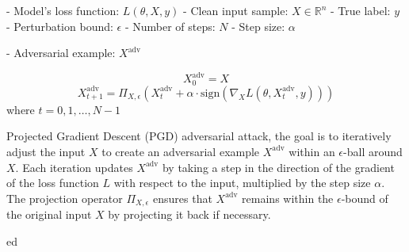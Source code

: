 - Model's loss function: $L(\theta, X, y)$
- Clean input sample: $X \in \mathbb{R}^n$
- True label: $y$
- Perturbation bound: $\epsilon$
- Number of steps: $N$
- Step size: $\alpha$

- Adversarial example: $X^{\text{adv}}$

\[
X^{\text{adv}}_0 = X
\]
\[
X^{\text{adv}}_{t+1} = \Pi_{X, \epsilon} \left( X^{\text{adv}}_t + \alpha \cdot \text{sign} \left( \nabla_X L(\theta, X^{\text{adv}}_t, y) \right) \right)
\]
where $t = 0, 1, \ldots, N-1$

Projected Gradient Descent (PGD) adversarial attack, the goal is to iteratively adjust the input $X$ to create an adversarial example $X^{\text{adv}}$ within an $\epsilon$-ball around $X$. Each iteration updates $X^{\text{adv}}$ by taking a step in the direction of the gradient of the loss function $L$ with respect to the input, multiplied by the step size $\alpha$. The projection operator $\Pi_{X, \epsilon}$ ensures that $X^{\text{adv}}$ remains within the $\epsilon$-bound of the original input $X$ by projecting it back if necessary.

ed